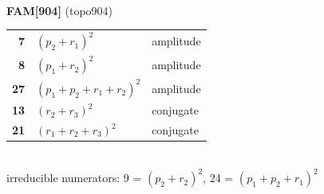 \documentclass[10pt]{article}
\begin{document}
\begin{minipage}[t]{0.48\textwidth}
{}\\[2mm]\textbf{FAM[904]} (topo904)\\[2pt]{\footnotesize\begin{tabular}{@{}r@{\ \ }l@{\ \ }l@{}}\textbf{7} & $(p_2+r_1)^2$ & amplitude\\
\textbf{8} & $(p_1+r_2)^2$ & amplitude\\
\textbf{27} & $(p_1+p_2+r_1+r_2)^2$ & amplitude\\
\textbf{13} & $(r_2+r_3)^2$ & conjugate\\
\textbf{21} & $(r_1+r_2+r_3)^2$ & conjugate\\\end{tabular}}\\[2pt]{\scriptsize irreducible numerators: 9 = $(p_2+r_2)^2$, 24 = $(p_1+p_2+r_1)^2$}\end{minipage}

\bigskip
\end{document}
